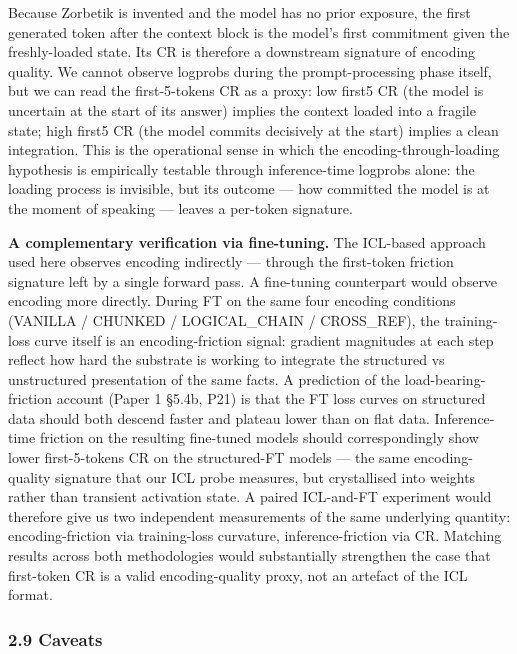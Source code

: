 \documentclass[
]{article}
\begin{document}
Because Zorbetik is invented and the model has no prior exposure, the
first generated token after the context block is the model's first
commitment given the freshly-loaded state. Its CR is therefore a
downstream signature of encoding quality. We cannot observe logprobs
during the prompt-processing phase itself, but we can read the
first-5-tokens CR as a proxy: low first5 CR (the model is uncertain at
the start of its answer) implies the context loaded into a fragile
state; high first5 CR (the model commits decisively at the start)
implies a clean integration. This is the operational sense in which the
encoding-through-loading hypothesis is empirically testable through
inference-time logprobs alone: the loading process is invisible, but its
outcome --- how committed the model is at the moment of speaking ---
leaves a per-token signature.

\textbf{A complementary verification via fine-tuning.} The ICL-based
approach used here observes encoding indirectly --- through the
first-token friction signature left by a single forward pass. A
fine-tuning counterpart would observe encoding more directly. During FT
on the same four encoding conditions (VANILLA / CHUNKED / LOGICAL\_CHAIN
/ CROSS\_REF), the training-loss curve itself is an encoding-friction
signal: gradient magnitudes at each step reflect how hard the substrate
is working to integrate the structured vs unstructured presentation of
the same facts. A prediction of the load-bearing-friction account (Paper
1 §5.4b, P21) is that the FT loss curves on structured data should both
descend faster and plateau lower than on flat data. Inference-time
friction on the resulting fine-tuned models should correspondingly show
lower first-5-tokens CR on the structured-FT models --- the same
encoding-quality signature that our ICL probe measures, but crystallised
into weights rather than transient activation state. A paired ICL-and-FT
experiment would therefore give us two independent measurements of the
same underlying quantity: encoding-friction via training-loss curvature,
inference-friction via CR. Matching results across both methodologies
would substantially strengthen the case that first-token CR is a valid
encoding-quality proxy, not an artefact of the ICL format.

\subsubsection{2.9 Caveats}\label{caveats}
\end{document}
